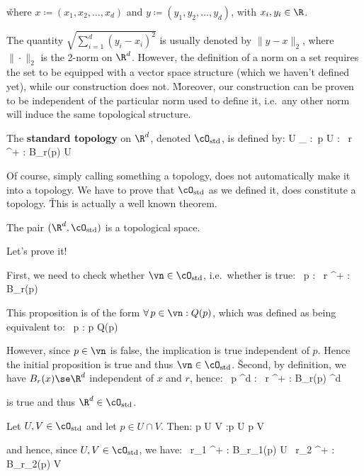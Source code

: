 \v

where $x \coloneqq (x_1,x_2,\ldots,x_d)$ and $y \coloneqq (y_1,y_2,\ldots,y_d)$, with $x_i,y_i\in\R$.
\ed

The quantity $\sqrt{\sum_{i=1}^d (y_i-x_i)^2}$ is usually denoted by $\|y-x\|_2$, where $\|\cdot\|_2$ is the 2-norm
on $\R^d$. However, the definition of a norm on a set requires the set to be equipped with a vector space structure
(which we haven't defined yet), while our construction does not. \v

Moreover, our construction can be proven to be independent of the particular norm used to define it, i.e.\ any other
norm will induce the same topological structure.

The \textbf{standard topology} on $\R^d$, denoted $\cO_\mathrm{std}$, is defined by:
\bse
U \in \cO_ :\eqv \forall \, p \in U : \exists \, r \in \R^+ : B_r(p) \se U
\ese
\ed

Of course, simply calling something a topology, does not automatically make it into a topology. We have to prove that
$\cO_\mathrm{std}$ as we defined it, does constitute a topology. \v

This is actually a well known theorem.

\bt[]
The pair $(\R^d,\cO_\mathrm{std})$ is a topological space.
\et

Let's prove it!

\bq
\ben
\item[i)] First, we need to check whether $\vn \in \cO_\mathrm{std}$, i.e.\ whether is true:
\bse
\forall \, p \in \vn : \exists \, r \in \R^+ : B_r(p) \se \vn
\ese

This proposition is of the form $\forall \, p \in \vn : Q(p)$, which was defined as being equivalent to:
\bse
\forall \, p : p \in \vn \imp Q(p)
\ese

However, since $p\in\vn$ is false, the implication is true independent of $p$. Hence the initial proposition is true
and thus $\vn \in \cO_\mathrm{std}$. \v

Second, by definition, we have $B_r(x)\se\R^d$ independent of $x$ and $r$, hence:
\bse
\forall \, p \in \R^d : \exists \, r \in \R^+ : B_r(p) \se \R^d
\ese

is true and thus $\R^d\in\cO_\mathrm{std}$.
\item[ii)] Let $U,V \in \cO_\mathrm{std}$ and let $p \in U \cap V$. Then:
\bse
p \in U \cap V :\eqv p \in U \land p \in V
\ese

and hence, since $U,V \in \cO_\mathrm{std}$, we have:
\bse
\exists \, r_1 \in \R^+ : B_{r_1}(p) \se U \quad \land \quad \exists \, r_2 \in \R^+ : B_{r_2}(p) \se V
\ese

